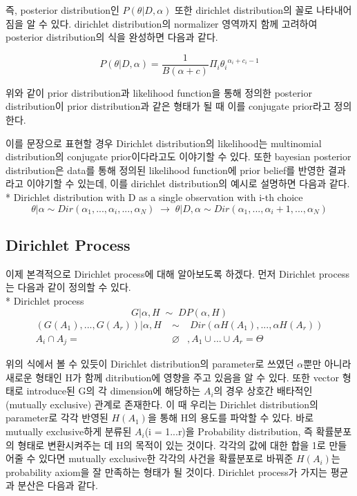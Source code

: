 \documentclass[a4paper]{oblivoir}
\begin{document}
즉, posterior distribution인  $P(\theta|D,\alpha)$ 또한 dirichlet distribution의 꼴로 나타내어짐을 알 수 있다. dirichlet distribution의 normalizer 영역까지 함께 고려하여 posterior distribution의 식을 완성하면 다음과 같다. 

\begin{equation}
P(\theta|D,\alpha) = \frac{1}{B(\alpha+c)}\Pi_{i}
{\theta_{i}}^{\alpha_{i}+c_{i}-1}
\end{equation}

위와 같이 prior distribution과 likelihood function을 통해 정의한 posterior distribution이 prior distribution과 같은 형태가 될 때 이를 conjugate prior라고 정의한다. 

이를 문장으로 표현할 경우 Dirichlet distribution의 likelihood는 multinomial distribution의 conjugate prior이다라고도 이야기할 수 있다. 또한 bayesian posterior distribution은 data를 통해 정의된 likelihood function에 prior belief를 반영한 결과라고 이야기할 수 있는데, 이를 dirichlet distribution의 예시로 설명하면 다음과 같다.\\

* Dirichlet distribution with D as a single observation with i-th choice
\begin{equation}
\theta|\alpha \sim Dir(\alpha_{1},...,\alpha_{i},...,\alpha_{N}) \; \rightarrow \; \theta|D,\alpha \sim Dir(\alpha_{1},...,\alpha_{i} + 1,...,\alpha_{N})
\end{equation}

\subsection{Dirichlet Process}
이제 본격적으로 Dirichlet process에 대해 알아보도록 하겠다. 먼저 Dirichlet process는 다음과 같이 정의할 수 있다.\\

* Dirichlet process
\begin{equation}
G|\alpha,H \; \sim \; DP(\alpha,H) 
\end{equation}
\begin{eqnarray}
(G(A_{1}),...,G(A_{r}))|\alpha,H \;&\sim&\; Dir(\alpha H(A_{1}),...,\alpha H(A_{r}))\nonumber\\
A_{i}\cap A_{j} = &\varnothing&,  A_{1}\cup ... \cup A_{r} = \Theta \nonumber
\end{eqnarray}

위의 식에서 볼 수 있듯이 Dirichlet distribution의 parameter로 쓰였던 $\alpha$뿐만 아니라 새로운 형태인 H가 함께 ditribution에 영향을 주고 있음을 알 수 있다. 또한 vector 형태로 introduce된 G의 각 dimension에 해당하는 $A_{i}$의 경우 상호간 배타적인 (mutually exclusive) 관계로 존재한다. 이 때 우리는 Dirichlet distribution의 parameter로 각각 반영된 $H(A_{1})$을 통해 H의 용도를 파악할 수 있다. 바로 mutually exclusive하게 분류된 $A_{i}$(i = 1...r)을 Probability distribution, 즉 확률분포의 형태로 변환시켜주는 데 H의 목적이 있는 것이다. 각각의 값에 대한 합을 1로 만들어줄 수 있다면 mutually exclusive한 각각의 사건을 확률분포로 바꿔준 $H(A_{i})$는 probability axiom을 잘 만족하는 형태가 될 것이다. Dirichlet process가 가지는 평균과 분산은 다음과 같다.\\
\end{document}
